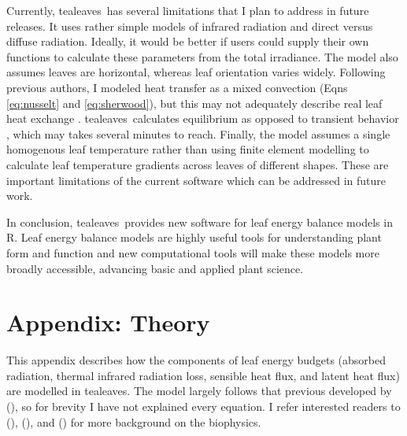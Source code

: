 \documentclass[11pt, oneside]{article}
\newcommand{\pkg}[1]{{\fontseries{b}\selectfont #1}}
\newcommand{\tealeaves}{\pkg{tealeaves}}
\begin{document}
Currently, \tealeaves~has several limitations that I plan to address in future releases. It uses rather simple models of infrared radiation and direct versus diffuse radiation. Ideally, it would be better if users could supply their own functions to calculate these parameters from the total irradiance. The model also assumes leaves are horizontal, whereas leaf orientation varies widely. Following previous authors, I modeled heat transfer as a mixed convection (Eqns \ref{eq:nusselt} and \ref{eq:sherwood}), but this may not adequately describe real leaf heat exchange \citep{Roth-Nebelsick_2001}. \tealeaves~calculates equilibrium as opposed to transient behavior \citep{Vialet-Chabrand_Lawson_2019}, which may takes several minutes to reach. Finally, the model assumes a single homogenous leaf temperature rather than using finite element modelling to calculate leaf temperature gradients across leaves of different shapes. These are important limitations of the current software which can be addressed in future work.

In conclusion, \tealeaves~provides new software for leaf energy balance models in R. Leaf energy balance models are highly useful tools for understanding plant form and function and new computational tools will make these models more broadly accessible, advancing basic and applied plant science.





\clearpage


\section*{Appendix: Theory}

This appendix describes how the components of leaf energy budgets (absorbed radiation, thermal infrared radiation loss, sensible heat flux, and latent heat flux) are modelled in \tealeaves. The model largely follows that previous developed by \citeauthor{Foster_Smith_1986} (\citeyear{Foster_Smith_1986}), so for brevity I have not explained every equation. I refer interested readers to \citeauthor{Nobel_2009} (\citeyear{Nobel_2009}), \citeauthor{Monteith_Unsworth_2013} (\citeyear{Monteith_Unsworth_2013}), and \citeauthor{Jones_2014} (\citeyear{Jones_2014}) for more background on the biophysics.
\end{document}
